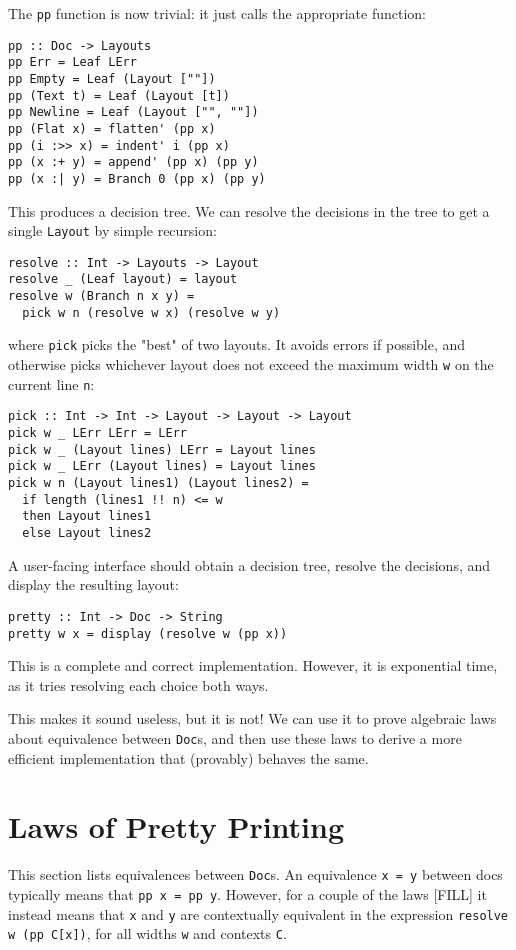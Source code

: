 \documentclass{article}
\newcommand{\code}[1]{\texttt{#1}}
\begin{document}
The \code{pp} function is now trivial: it just calls the appropriate function:
\begin{lstlisting}
pp :: Doc -> Layouts
pp Err = Leaf LErr
pp Empty = Leaf (Layout [""])
pp (Text t) = Leaf (Layout [t])
pp Newline = Leaf (Layout ["", ""])
pp (Flat x) = flatten' (pp x)
pp (i :>> x) = indent' i (pp x)
pp (x :+ y) = append' (pp x) (pp y)
pp (x :| y) = Branch 0 (pp x) (pp y)
\end{lstlisting}

This produces a decision tree. We can resolve the decisions in the tree to get a single
\code{Layout} by simple recursion:
\begin{lstlisting}
resolve :: Int -> Layouts -> Layout
resolve _ (Leaf layout) = layout
resolve w (Branch n x y) =
  pick w n (resolve w x) (resolve w y)
\end{lstlisting}
where \code{pick} picks the "best" of two layouts. It avoids errors if possible, and otherwise picks
whichever layout does not exceed the maximum width \code{w} on the current line \code{n}:
\begin{lstlisting}
pick :: Int -> Int -> Layout -> Layout -> Layout
pick w _ LErr LErr = LErr
pick w _ (Layout lines) LErr = Layout lines
pick w _ LErr (Layout lines) = Layout lines
pick w n (Layout lines1) (Layout lines2) =
  if length (lines1 !! n) <= w
  then Layout lines1
  else Layout lines2
\end{lstlisting}

A user-facing interface should obtain a decision tree, resolve the decisions, and display the
resulting layout:
\begin{lstlisting}
pretty :: Int -> Doc -> String
pretty w x = display (resolve w (pp x))
\end{lstlisting}

This is a complete and correct implementation. However, it is exponential time, as it tries
resolving each choice both ways.

This makes it sound useless, but it is not! We can use it to prove algebraic laws about equivalence
between \code{Doc}s, and then use these laws to derive a more efficient implementation that (provably)
behaves the same.

\section{Laws of Pretty Printing}

This section lists equivalences between \code{Doc}s. An equivalence \code{x = y} between docs
typically means that \code{pp x = pp y}. However, for a couple of the laws [FILL] it instead means
that \code{x} and \code{y} are contextually equivalent in the expression \code{resolve w (pp C[x])},
for all widths \code{w} and contexts \code{C}.
\end{document}
